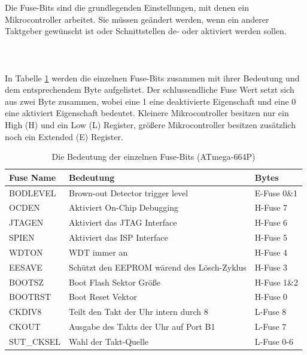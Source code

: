 Die Fuse-Bits sind die grundlegenden Einstellungen, mit denen ein
Mikrocontroller arbeitet. Sie müssen geändert werden, wenn ein anderer Taktgeber
gewünscht ist oder Schnittstellen de- oder aktiviert werden sollen.\\
\\
\\
\\
In Tabelle \ref{fuses-names} werden die einzelnen Fuse-Bits zusammen mit ihrer
Bedeutung und dem entsprechendem Byte aufgelistet. Der schlussendliche Fuse Wert
setzt sich aus zwei Byte zusammen, wobei eine 1 eine deaktivierte Eigenschaft und
eine 0 eine aktiviert Eigenschaft bedeutet. Kleinere Mikrocontroller besitzen nur ein
High (H) und ein Low (L) Register, größere Mikrocontroller besitzen zusätzlich
noch ein Extended (E) Register.

\begin{table} [H]
\begin{tabular}{|l|l|l|} \hline
Fuse Name & Bedeutung & Bytes\\ \hline
BODLEVEL & Brown-out Detector trigger level & E-Fuse 0\&1\\ \hline
OCDEN & Aktiviert On-Chip Debugging & H-Fuse 7\\ \hline
JTAGEN & Aktiviert das \ac{JTAG} Interface & H-Fuse 6\\ \hline
SPIEN & Aktiviert das \ac{ISP} Interface & H-Fuse 5\\ \hline
WDTON & \ac{WDT} immer an & H-Fuse 4\\ \hline
EESAVE & Schützt den \acs{EEPROM} wärend des Lösch-Zyklus & H-Fuse 3\\ \hline
BOOTSZ & Boot Flash Sektor Größe & H-Fuse 1\&2\\ \hline
BOOTRST & Boot Reset Vektor & H-Fuse 0\\ \hline
CKDIV8 & Teilt den Takt der Uhr intern durch 8 & L-Fuse 8\\ \hline
CKOUT & Ausgabe des Takts der Uhr auf Port B1 & L-Fuse 7\\ \hline
SUT\_CKSEL & Wahl der Takt-Quelle & L-Fuse 0-6\\ \hline
\end{tabular}
\caption{Die Bedeutung der einzelnen Fuse-Bits (ATmega-664P)}
\label{fuses-names}
\end{table}

